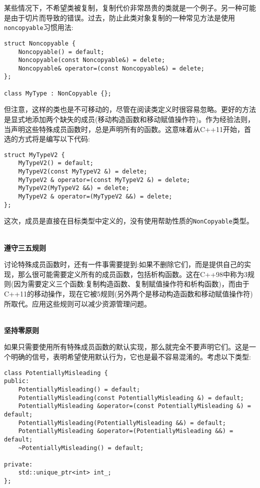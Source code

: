 某些情况下，不希望类被复制，复制代价非常昂贵的类就是一个例子。另一种可能是由于切片而导致的错误。过去，防止此类对象复制的一种常见方法是使用\texttt{noncopyable}习惯用法:

\begin{lstlisting}[style=styleCXX]
struct Noncopyable {
	Noncopyable() = default;
	Noncopyable(const Noncopyable&) = delete;
	Noncopyable& operator=(const Noncopyable&) = delete;
};

class MyType : NonCopyable {};
\end{lstlisting}

但注意，这样的类也是不可移动的，尽管在阅读类定义时很容易忽略。更好的方法是显式地添加两个缺失的成员(移动构造函数和移动赋值操作符)。作为经验法则，当声明这些特殊成员函数时，总是声明所有的函数。这意味着从C++11开始，首选的方式将是编写以下代码:

\begin{lstlisting}[style=styleCXX]
struct MyTypeV2 {
	MyTypeV2() = default;
	MyTypeV2(const MyTypeV2 &) = delete;
	MyTypeV2 & operator=(const MyTypeV2 &) = delete;
	MyTypeV2(MyTypeV2 &&) = delete;
	MyTypeV2 & operator=(MyTypeV2 &&) = delete;
};
\end{lstlisting}

这次，成员是直接在目标类型中定义的，没有使用帮助性质的\texttt{NonCopyable}类型。

\hspace*{\fill} \\ %
\noindent
\textbf{遵守三五规则}

讨论特殊成员函数时，还有一件事需要提到:如果不删除它们，而是提供自己的实现，那么很可能需要定义所有的成员函数，包括析构函数。这在C++98中称为3规则(因为需要定义三个函数:复制构造函数、复制赋值操作符和析构函数)，而由于C++11的移动操作，现在它被5规则(另外两个是移动构造函数和移动赋值操作符)所取代。应用这些规则可以减少资源管理问题。

\hspace*{\fill} \\ %
\noindent
\textbf{坚持零原则}

如果只需要使用所有特殊成员函数的默认实现，那么就完全不要声明它们。这是一个明确的信号，表明希望使用默认行为，它也是最不容易混淆的。考虑以下类型:

\begin{lstlisting}[style=styleCXX]
class PotentiallyMisleading {
public:
	PotentiallyMisleading() = default;
	PotentiallyMisleading(const PotentiallyMisleading &) = default;
	PotentiallyMisleading &operator=(const PotentiallyMisleading &) =
default;
	PotentiallyMisleading(PotentiallyMisleading &&) = default;
	PotentiallyMisleading &operator=(PotentiallyMisleading &&) = default;
	~PotentiallyMisleading() = default;
	
private:
	std::unique_ptr<int> int_;
};
\end{lstlisting}

